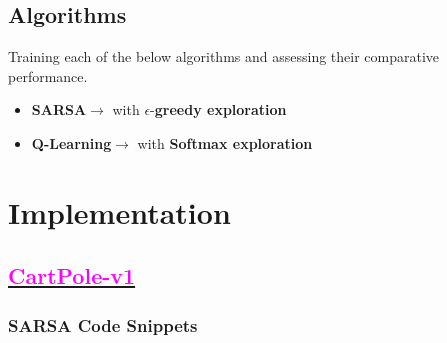 \documentclass[11pt, a4]{article}
\begin{document}
		\subsection{Algorithms}
		Training each of the below algorithms and assessing their comparative performance.
		\begin{itemize}
			\item \textbf{SARSA}$\rightarrow$ with $\epsilon$-\textbf{greedy exploration}
			\item \textbf{Q-Learning}$\rightarrow$ with \textbf{Softmax exploration}
		\end{itemize}
	\section{Implementation}
		\subsection{\href{https://github.com/RitabrataMandal/RL-DA6400-assignment_1}{\textcolor{magenta}{CartPole-v1}}}
			\subsubsection{SARSA Code Snippets}
%				
\end{document}
